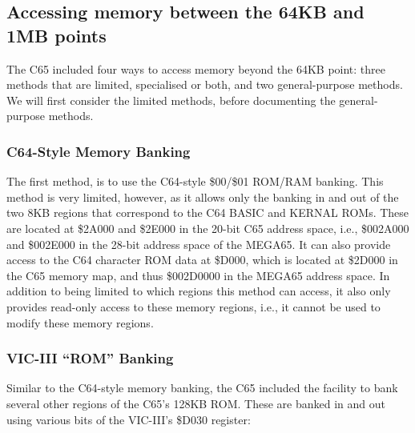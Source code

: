 \subsection{Accessing memory between the 64KB and 1MB points}

The C65 included four ways to access memory beyond the 64KB point: three methods
that are limited, specialised or both, and two general-purpose methods. We will first
consider the limited methods, before documenting the general-purpose methods.

\subsubsection{C64-Style Memory Banking}

The first method, is to use the C64-style \$00/\$01 ROM/RAM banking.
This method is very limited, however, as it allows only the banking in
and out of the two 8KB regions that correspond to the C64 BASIC and
KERNAL ROMs.  These are located at \$2A000 and \$2E000 in the 20-bit
C65 address space, i.e., \$002A000 and \$002E000 in the 28-bit address
space of the MEGA65.  It can also provide access to the C64 character ROM
data at \$D000, which is located at \$2D000 in the C65 memory map, and thus \$002D0000 in
the MEGA65 address space.  In addition to being limited to which regions this
method can access, it also only provides read-only access
to these memory regions, i.e., it cannot be used to modify these memory regions.

\subsubsection{VIC-III ``ROM'' Banking}

Similar to the C64-style memory banking, the C65 included the facility
to bank several other regions of the C65's 128KB ROM.  These are banked
in and out using various bits of the VIC-III's \$D030 register:

